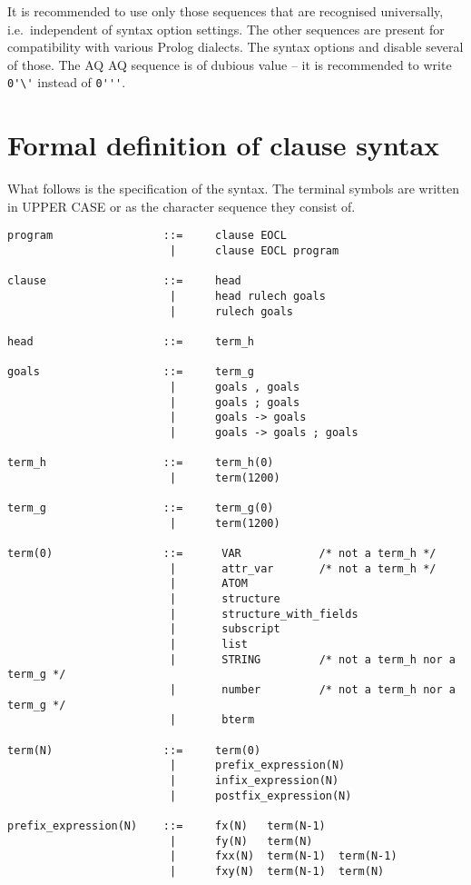 It is recommended to use only those sequences that are recognised universally,
i.e.\ independent of syntax option settings.  The other sequences are present
for compatibility with various Prolog dialects.  The syntax options
 and  disable several
of those.  The AQ AQ sequence is of dubious value -- it is recommended to
write \verb.0'\'. instead of \verb.0'''..


\section{Formal definition of clause syntax}
What follows is the specification of the syntax. The terminal symbols are
written in UPPER CASE or as the character sequence they consist of.
\begin{verbatim}
program                 ::=     clause EOCL
                         |      clause EOCL program

clause                  ::=     head
                         |      head rulech goals
                         |      rulech goals

head                    ::=     term_h

goals                   ::=     term_g
                         |      goals , goals
                         |      goals ; goals
                         |      goals -> goals
                         |      goals -> goals ; goals

term_h                  ::=     term_h(0)
                         |      term(1200)

term_g                  ::=     term_g(0)
                         |      term(1200)

term(0)                 ::=      VAR            /* not a term_h */
                         |       attr_var       /* not a term_h */
                         |       ATOM
                         |       structure
                         |       structure_with_fields
                         |       subscript
                         |       list
                         |       STRING         /* not a term_h nor a term_g */
                         |       number         /* not a term_h nor a term_g */
                         |       bterm

term(N)                 ::=     term(0)
                         |      prefix_expression(N)
                         |      infix_expression(N)
                         |      postfix_expression(N)

prefix_expression(N)    ::=     fx(N)   term(N-1)
                         |      fy(N)   term(N)
                         |      fxx(N)  term(N-1)  term(N-1)
                         |      fxy(N)  term(N-1)  term(N)
\end{verbatim}
